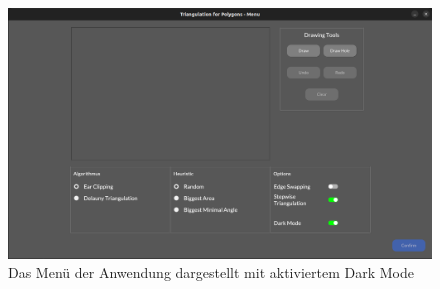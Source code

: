 \begin{figure}[h]
    \centering
    \includegraphics[width=1\textwidth]{bilder/darkmode.png}
    \caption[Menü im Dark Mode]{Das Menü der Anwendung dargestellt mit aktiviertem Dark Mode}
    
\end{figure}
